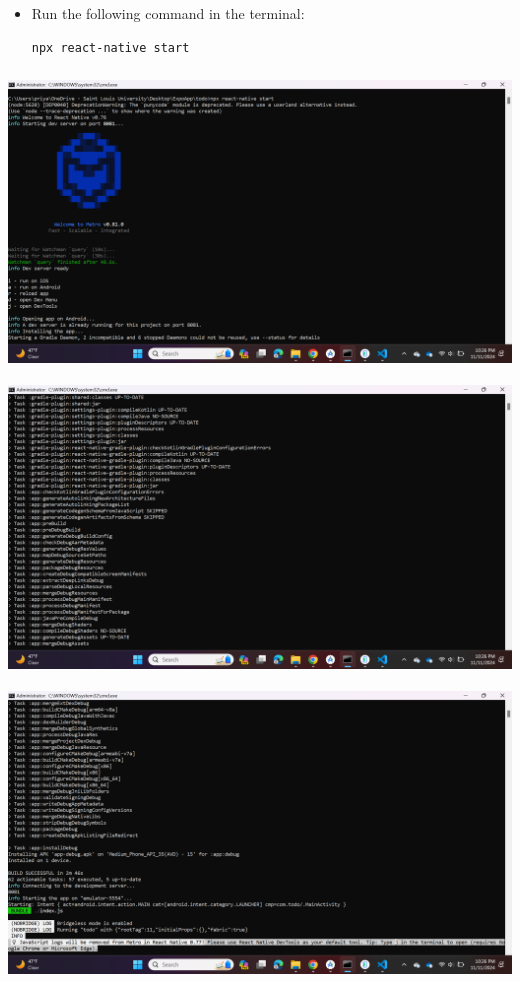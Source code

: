 \documentclass{article}
\begin{document}
\begin{itemize}
    \item Run the following command in the terminal:
    \begin{lstlisting}[language=bash]
    npx react-native start
    \end{lstlisting}
\end{itemize}
\includegraphics[width=5.57813in,height=3.13391in]{media/image13.png}
\includegraphics[width=5.57813in,height=3.13391in]{media/image12.png}
\includegraphics[width=5.57813in,height=3.13391in]{media/image20.png}
\end{document}
